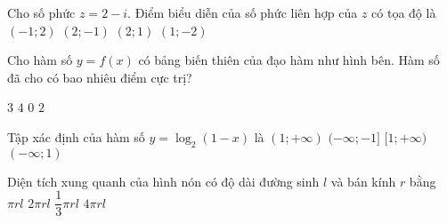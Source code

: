 \begin{ex}%
Cho số phức $z=2-i$. Điểm biểu diễn của số phức liên hợp của $z$ có tọa độ là
\choice
{$(-1; 2)$}
{$(2;-1)$}
{\True $(2; 1)$}
{$(1;-2)$}

\end{ex}
\begin{ex}%
	\immini
	{
Cho hàm số $y=f(x)$ có bảng biến thiên của đạo hàm như hình bên. Hàm số đã cho có bao nhiêu điểm cực trị?
}
{
}

\choice
{$3$}
{$4$}
{\True $0$}
{$2$}
\end{ex}
\begin{ex}%
Tập xác định của hàm số $y=\log_2(1-x)$ là
\choice
{$(1;+\infty)$}
{$(-\infty;-1]$}
{$[1;+\infty)$}
{\True $(-\infty; 1)$}

\end{ex}
\begin{ex}%
Diện tích xung quanh của hình nón có độ dài đường sinh $l$ và bán kính $r$ bằng
\choice
{\True $\pi r l$}
{$2\pi r l$}
{$\dfrac{1}{3} \pi r l$}
{$4\pi r l$}

\end{ex}

